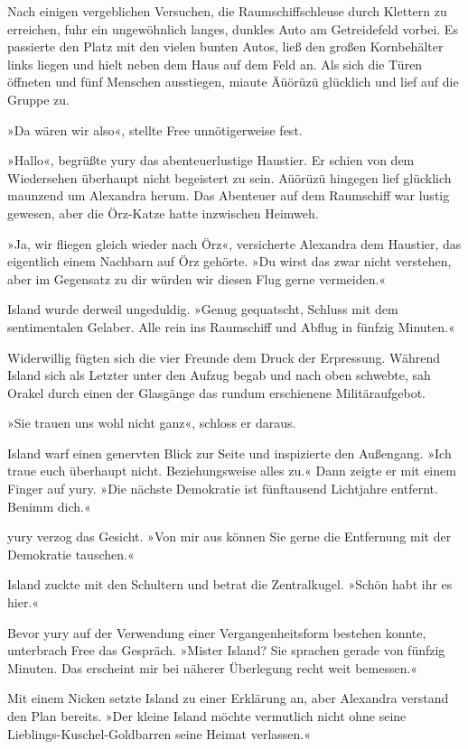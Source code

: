 Nach einigen vergeblichen Versuchen, die Raumschiffschleuse durch Klettern zu erreichen, fuhr ein ungewöhnlich langes, dunkles Auto am Getreidefeld vorbei. Es passierte den Platz mit den vielen bunten Autos, ließ den großen Kornbehälter links liegen und hielt neben dem Haus auf dem Feld an. Als sich die Türen öffneten und fünf Menschen ausstiegen, miaute Äüörüzü glücklich und lief auf die Gruppe zu.

»Da wären wir also«, stellte Free unnötigerweise fest.

»Hallo«, begrüßte yury das abenteuerlustige Haustier. Er schien von dem Wiedersehen überhaupt nicht begeistert zu sein. Aüörüzü hingegen lief glücklich maunzend um Alexandra herum. Das Abenteuer auf dem Raumschiff war lustig gewesen, aber die Örz-Katze hatte inzwischen Heimweh.

»Ja, wir fliegen gleich wieder nach Örz«, versicherte Alexandra dem Haustier, das eigentlich einem Nachbarn auf Örz gehörte. »Du wirst das zwar nicht verstehen, aber im Gegensatz zu dir würden wir diesen Flug gerne vermeiden.«

Island wurde derweil ungeduldig. »Genug gequatscht, Schluss mit dem sentimentalen Gelaber. Alle rein ins Raumschiff und Abflug in fünfzig Minuten.«

Widerwillig fügten sich die vier Freunde dem Druck der Erpressung. Während Island sich als Letzter unter den Aufzug begab und nach oben schwebte, sah Orakel durch einen der Glasgänge das rundum erschienene Militäraufgebot.

»Sie trauen uns wohl nicht ganz«, schloss er daraus.

Island warf einen genervten Blick zur Seite und inspizierte den Außengang. »Ich traue euch überhaupt nicht. Beziehungsweise alles zu.« Dann zeigte er mit einem Finger auf yury. »Die nächste Demokratie ist fünftausend Lichtjahre entfernt. Benimm dich.«

yury verzog das Gesicht. »Von mir aus können Sie gerne die Entfernung mit der Demokratie tauschen.«

Island zuckte mit den Schultern und betrat die Zentralkugel. »Schön habt ihr es hier.«

Bevor yury auf der Verwendung einer Vergangenheitsform bestehen konnte, unterbrach Free das Gespräch. »Mister Island? Sie sprachen gerade von fünfzig Minuten. Das erscheint mir bei näherer Überlegung recht weit bemessen.«

Mit einem Nicken setzte Island zu einer Erklärung an, aber Alexandra verstand den Plan bereits. »Der kleine Island möchte vermutlich nicht ohne seine Lieblings-Kuschel-Goldbarren seine Heimat verlassen.«

